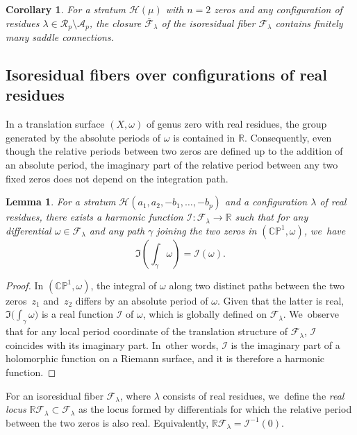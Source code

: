 \documentclass[11pt]{article}
\newtheorem{cor}[thm]{Corollary}
\newtheorem{lem}[thm]{Lemma}
\theoremstyle{definition}
\begin{document}
\begin{cor}\label{cor:SCFinite}
For a stratum $\mathcal{H}(\mu)$ with $n=2$ zeros and any configuration of residues $\lambda \in \mathcal{R}_{p} \setminus \mathcal{A}_{p}$, the closure $\overline{\mathcal{F}}_{\lambda}$ of the isoresidual fiber $\mathcal{F}_{\lambda}$ contains finitely many saddle connections.
\end{cor}

\subsection{Isoresidual fibers over configurations of real residues}\label{sub:FiberReal}

In a translation surface $(X,\omega)$ of genus zero with real residues, the group generated by the absolute periods of $\omega$ is contained in $\mathbb{R}$. Consequently, even though the relative periods between two zeros are defined up to the addition of an absolute period, the imaginary part of the relative period between any two fixed zeros does not depend on the integration path.

\begin{lem}\label{lem:Imaginary}
For a stratum $\mathcal{H}(a_{1},a_{2},-b_{1},\dots,-b_{p})$ and a configuration $\lambda$ of real residues, there exists a harmonic function $\mathcal{I}\colon\mathcal{F}_{\lambda} \to \mathbb{R}$ such that for any differential $\omega \in \mathcal{F}_{\lambda}$ and any path $\gamma$ joining the two zeros in $(\mathbb{CP}^{1},\omega)$, we~have
\[
\Im \left( \int_{\gamma} \omega \right) = \mathcal{I}(\omega).
\]
\end{lem}

\begin{proof}
In $(\mathbb{CP}^{1},\omega)$, the integral of $\omega$ along two distinct paths between the two zeros~$z_{1}$ and~$z_{2}$ differs by an absolute period of $\omega$. Given that the latter is real, $\Im\big(\int_{\gamma} \omega\big)$ is a real function $\mathcal{I}$ of $\omega$, which is globally defined on $\mathcal F_\lambda$. We~observe that for any local period coordinate of the translation structure of $\mathcal{F}_{\lambda}$, $\mathcal{I}$ coincides with its imaginary part. In~other words, $\mathcal{I}$ is the imaginary part of a holomorphic function on a Riemann surface, and it is therefore a harmonic function.
\end{proof}

For an isoresidual fiber $\mathcal{F}_{\lambda}$, where $\lambda$ consists of real residues, we~define the \textit{real locus} $\mathbb{R}\mathcal{F}_{\lambda} \subset \mathcal{F}_{\lambda}$ as the locus formed by differentials for which the relative period between the two zeros is also real. Equivalently, $\mathbb{R}\mathcal{F}_{\lambda} = \mathcal{I}^{-1}(0)$.
\end{document}
